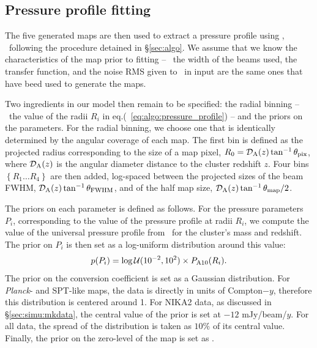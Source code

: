 \subsection{Pressure profile fitting}

The five generated maps are then used to extract a pressure profile using \panco, \ie\ following the procedure detained in \S\ref{sec:algo}.
We assume that we know the characteristics of the map prior to fitting -- \ie\ the width of the beams used, the transfer function, and the noise RMS given to \panco\ in input are the same ones that have beed used to generate the maps.

Two ingredients in our model then remain to be specified: the radial binning -- \ie\ the value of the radii $R_i$ in eq.(~\ref{eq:algo:pressure_profile}) -- and the priors on the parameters.
For the radial binning, we choose one that is identically determined by the angular coverage of each map.
The first bin is defined as the projected radius corresponding to the size of a map pixel, $R_0 = \mathcal{D}_{\rm A}(z) \tan^{-1} \theta_{\rm pix}$, where $\mathcal{D}_{\rm A}(z)$ is the angular diameter distance to the cluster redshift $z$.
Four bins $\left\{R_1 \dots R_4 \right\}$ are then added, log-spaced between the projected sizes of the beam FWHM, $\mathcal{D}_{\rm A}(z) \tan^{-1} \theta_{\rm FWHM}$, and of the half map size, $\mathcal{D}_{\rm A}(z) \tan^{-1} \theta_{\rm map} / 2$.

The priors on each parameter is defined as follows.
For the pressure parameters $P_i$, corresponding to the value of the pressure profile at radii $R_i$, we compute the value of the universal pressure profile from \aten\ for the cluster's mass and redshift.
The prior on $P_i$ is then set as a log-uniform distribution around this value:
\begin{equation}
    \label{eq:simu:prior_Pi}
    p(P_i) = \log\mathcal{U}(10^{-2}, 10^2) \times P_{\rm A10}(R_i).
\end{equation}
The prior on the conversion coefficient is set as a Gaussian distribution.
For \textit{Planck}- and SPT-like maps, the data is directly in units of Compton$-y$, therefore this distribution is centered around 1.
For NIKA2 data, as discussed in \S\ref{sec:simu:mkdata}, the central value of the prior is set at $-12$ mJy/beam/$y$.
For all data, the spread of the distribution is taken as $10\%$ of its central value.
Finally, the prior on the zero-level of the map is set as .

